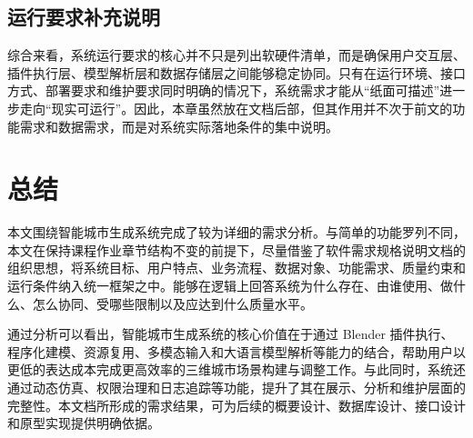\documentclass[UTF8,a4paper,10pt]{ctexart}
\begin{document}
\subsection{运行要求补充说明}
综合来看，系统运行要求的核心并不只是列出软硬件清单，而是确保用户交互层、插件执行层、模型解析层和数据存储层之间能够稳定协同。只有在运行环境、接口方式、部署要求和维护要求同时明确的情况下，系统需求才能从“纸面可描述”进一步走向“现实可运行”。因此，本章虽然放在文档后部，但其作用并不次于前文的功能需求和数据需求，而是对系统实际落地条件的集中说明。

\section{总结}
本文围绕智能城市生成系统完成了较为详细的需求分析。与简单的功能罗列不同，本文在保持课程作业章节结构不变的前提下，尽量借鉴了软件需求规格说明文档的组织思想，将系统目标、用户特点、业务流程、数据对象、功能需求、质量约束和运行条件纳入统一框架之中。能够在逻辑上回答系统为什么存在、由谁使用、做什么、怎么协同、受哪些限制以及应达到什么质量水平。

通过分析可以看出，智能城市生成系统的核心价值在于通过 Blender 插件执行、程序化建模、资源复用、多模态输入和大语言模型解析等能力的结合，帮助用户以更低的表达成本完成更高效率的三维城市场景构建与调整工作。与此同时，系统还通过动态仿真、权限治理和日志追踪等功能，提升了其在展示、分析和维护层面的完整性。本文档所形成的需求结果，可为后续的概要设计、数据库设计、接口设计和原型实现提供明确依据。
\end{document}
